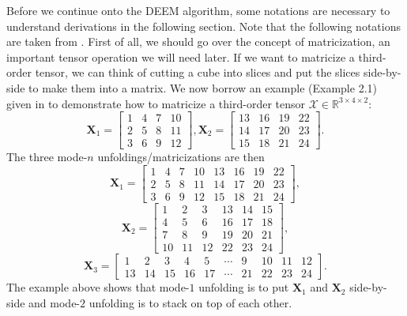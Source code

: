 \documentclass[11pt]{article}
\begin{document}
Before we continue onto the DEEM algorithm, some notations are necessary to understand derivations in the following section. Note that the following notations are taken from \cite{kolda2009review}. First of all, we should go over the concept of matricization, an important tensor operation we will need later. If we want to matricize a third-order tensor, we can think of cutting a cube into slices and put the slices side-by-side to make them into a matrix. We now borrow an example (Example 2.1) given in \cite{kolda2009review} to demonstrate how to matricize a third-order tensor $\mathcal{X} \in \mathbb{R}^{3\times 4 \times 2}$: 
\begin{equation*}
    \mathbf{X}_1 = \begin{bmatrix}
        1 & 4 & 7 & 10 \\ 2 & 5 & 8 & 11 \\ 3 & 6 & 9 & 12 
    \end{bmatrix}, 
    \mathbf{X}_2 = \begin{bmatrix} 13 & 16 & 19 & 22 \\ 14 & 17 & 20 & 23 \\ 15 & 18 & 21 & 24  \end{bmatrix}.    
\end{equation*}
The three mode-$n$ unfoldings/matricizations are then
\begin{equation*}
    \mathbf{X}_1 = \begin{bmatrix}
        1 & 4 & 7 & 10 & 13 & 16 & 19 & 22 \\ 2 & 5 & 8 & 11 & 14 & 17 & 20 & 23 \\ 3 & 6 & 9 & 12 & 15 & 18 & 21 & 24
    \end{bmatrix},
\end{equation*}
\begin{equation*}
    \mathbf{X}_2 = \begin{bmatrix}
        1 & 2 & 3 & 13 & 14 & 15 \\ 4 & 5 & 6 & 16 & 17 & 18 \\ 7 & 8 & 9 & 19 & 20 & 21 \\ 10 & 11 & 12 & 22 & 23  & 24
    \end{bmatrix},
\end{equation*}
\begin{equation*}
    \mathbf{X}_3 = \begin{bmatrix}
        1 & 2 & 3 & 4 & 5 & \cdots & 9 & 10 & 11 & 12 \\ 13 & 14 & 15 & 16 & 17 & \cdots & 21 & 22 & 23 & 24 
    \end{bmatrix}.
\end{equation*}
The example above shows that mode-$1$ unfolding is to put $\mathbf{X}_1$ and $\mathbf{X}_2$ side-by-side and mode-$2$ unfolding is to stack on top of each other. 
\end{document}
